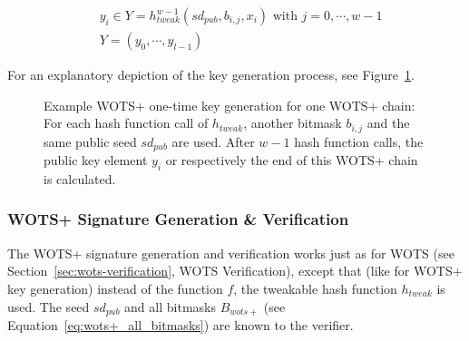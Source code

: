 \begin{align}
\label{eq:wots+_pubkeygen}
&y_i \in Y = h_{tweak}^{w-1}(sd_{pub},b_{i,j}, x_i) \text{ with } j= 0,\cdots,w-1 \\
&Y = (y_0, \cdots, y_{l-1})
\end{align}

For an explanatory depiction of the key generation process, see Figure~\ref{img:wots+_bitmask_hashcall}.


\begin{figure}
\centering
{}
\caption{Example WOTS+ one-time key generation for one WOTS+ chain: For each hash function call of $h_{tweak}$, another bitmask $b_{i,j}$ and the same public seed $sd_{pub}$ are used. After $w-1$ hash function calls, the public key element $y_i$ or respectively the end of this WOTS+ chain is calculated.}
\label{img:wots+_bitmask_hashcall}
\end{figure}


\subsubsection{WOTS+ Signature Generation \& Verification}
The WOTS+ signature generation and verification works just as for WOTS (see Section~\ref{sec:wots-verification}, WOTS Verification), except that (like for WOTS+ key generation) instead of the function $f$, the tweakable hash function $h_{tweak}$ is used. The seed $sd_{pub}$ and all bitmasks $B_{wots+}$ (see Equation~\ref{eq:wots+_all_bitmasks}) are known to the verifier.


